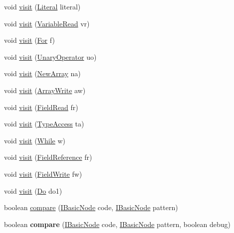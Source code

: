 \begin{DoxyCompactItemize}
void \hyperlink{classmain_1_1_pattern_matcher_a29b399d8bb2d3185737b6c1d12f9bcf9}{visit} (\hyperlink{classparser_1_1_literal}{Literal} literal)
\item 
void \hyperlink{classmain_1_1_pattern_matcher_a6d8b60542bd83208490fd18c0c2f35b1}{visit} (\hyperlink{classparser_1_1_variable_read}{Variable\+Read} vr)
\item 
void \hyperlink{classmain_1_1_pattern_matcher_a801b7ebb393ae0b0cefe09d248595055}{visit} (\hyperlink{classparser_1_1_for}{For} f)
\item 
void \hyperlink{classmain_1_1_pattern_matcher_afee823fb5502c935ce9ca48edb799839}{visit} (\hyperlink{classparser_1_1_unary_operator}{Unary\+Operator} uo)
\item 
void \hyperlink{classmain_1_1_pattern_matcher_a7d15f582c1bd52f023138defb35823d7}{visit} (\hyperlink{classparser_1_1_new_array}{New\+Array} na)
\item 
void \hyperlink{classmain_1_1_pattern_matcher_a80fd264c1fc10b5680eba618597569cd}{visit} (\hyperlink{classparser_1_1_array_write}{Array\+Write} aw)
\item 
void \hyperlink{classmain_1_1_pattern_matcher_ae22d3a6d24ce27b5b255e15ff79a41e8}{visit} (\hyperlink{classparser_1_1_field_read}{Field\+Read} fr)
\item 
void \hyperlink{classmain_1_1_pattern_matcher_ab3357d751e805fa754e84e697ebf17e0}{visit} (\hyperlink{classparser_1_1_type_access}{Type\+Access} ta)
\item 
void \hyperlink{classmain_1_1_pattern_matcher_a0e02cbc4967987ae699e9413e80e4783}{visit} (\hyperlink{classparser_1_1_while}{While} w)
\item 
void \hyperlink{classmain_1_1_pattern_matcher_aa2cf22c8d29a5d37d97c726a54a99adf}{visit} (\hyperlink{classparser_1_1_field_reference}{Field\+Reference} fr)
\item 
void \hyperlink{classmain_1_1_pattern_matcher_ae74cfeec943a0d5f3581b6b34fea80fd}{visit} (\hyperlink{classparser_1_1_field_write}{Field\+Write} fw)
\item 
void \hyperlink{classmain_1_1_pattern_matcher_a3eef3e7e6dd06473cecf2fa28ed56dc3}{visit} (\hyperlink{classparser_1_1_do}{Do} do1)
\item 
boolean \hyperlink{classmain_1_1_pattern_matcher_af9174c55f4fb50c631d4e78b41731d75}{compare} (\hyperlink{interfaceparser_1_1_i_basic_node}{I\+Basic\+Node} code, \hyperlink{interfaceparser_1_1_i_basic_node}{I\+Basic\+Node} pattern)
\item 
boolean {\bfseries compare} (\hyperlink{interfaceparser_1_1_i_basic_node}{I\+Basic\+Node} code, \hyperlink{interfaceparser_1_1_i_basic_node}{I\+Basic\+Node} pattern, boolean debug)\hypertarget{classmain_1_1_pattern_matcher_a26ff8752615673913bf1135ff7a39ed7}{}\label{classmain_1_1_pattern_matcher_a26ff8752615673913bf1135ff7a39ed7}


\end{DoxyCompactItemize}

